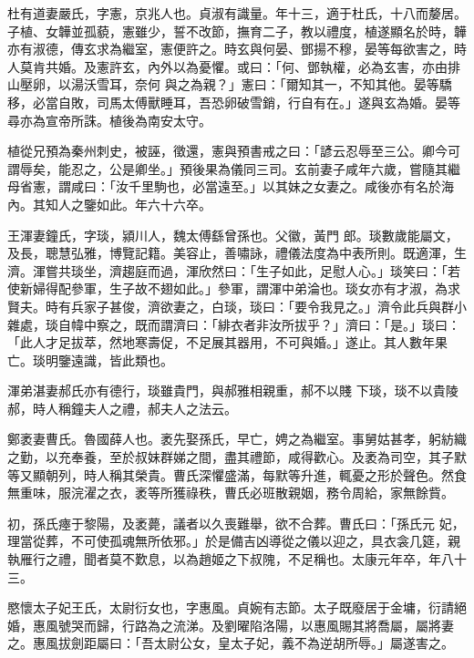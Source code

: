 \begin{pinyinscope}
 杜有道妻嚴氏，字憲，京兆人也。貞淑有識量。年十三，適于杜氏，十八而嫠居。子植、女韡並孤藐，憲雖少，誓不改節，撫育二子，教以禮度，植遂顯名於時，韡亦有淑德，傳玄求為繼室，憲便許之。時玄與何晏、鄧揚不穆，晏等每欲害之，時人莫肯共婚。及憲許玄，內外以為憂懼。或曰：「何、鄧執權，必為玄害，亦由排山壓卵，以湯沃雪耳，奈何
 與之為親？」憲曰：「爾知其一，不知其他。晏等驕移，必當自敗，司馬太傅獸睡耳，吾恐卵破雪銷，行自有在。」遂與玄為婚。晏等尋亦為宣帝所誅。植後為南安太守。



 植從兄預為秦州刺史，被誣，徵還，憲與預書戒之曰：「諺云忍辱至三公。卿今可謂辱矣，能忍之，公是卿坐。」預後果為儀同三司。玄前妻子咸年六歲，嘗隨其繼母省憲，謂咸曰：「汝千里駒也，必當遠至。」以其妹之女妻之。咸後亦有名於海內。其知人之鑒如此。年六十六卒。



 王渾妻鐘氏，字琰，潁川人，魏太傅繇曾孫也。父徽，黃門
 郎。琰數歲能屬文，及長，聰慧弘雅，博覽記籍。美容止，善嘯詠，禮儀法度為中表所則。既適渾，生濟。渾嘗共琰坐，濟趨庭而過，渾欣然曰：「生子如此，足慰人心。」琰笑曰：「若使新婦得配參軍，生子故不翅如此。」參軍，謂渾中弟淪也。琰女亦有才淑，為求賢夫。時有兵家子甚俊，濟欲妻之，白琰，琰曰：「要令我見之。」濟令此兵與群小雜處，琰自幃中察之，既而謂濟曰：「緋衣者非汝所拔乎？」濟曰：「是。」琰曰：「此人才足拔萃，然地寒壽促，不足展其器用，不可與婚。」遂止。其人數年果亡。琰明鑒遠識，皆此類也。



 渾弟湛妻郝氏亦有德行，琰雖貴門，與郝雅相親重，郝不以賤
 下琰，琰不以貴陵郝，時人稱鐘夫人之禮，郝夫人之法云。



 鄭袤妻曹氏。魯國薛人也。袤先娶孫氏，早亡，娉之為繼室。事舅姑甚孝，躬紡織之勤，以充奉養，至於叔妹群娣之間，盡其禮節，咸得歡心。及袤為司空，其子默等又顯朝列，時人稱其榮貴。曹氏深懼盛滿，每默等升進，輒憂之形於聲色。然食無重味，服浣濯之衣，袤等所獲祿秩，曹氏必班散親姻，務令周給，家無餘貲。



 初，孫氏瘞于黎陽，及袤薨，議者以久喪難舉，欲不合葬。曹氏曰：「孫氏元
 妃，理當從葬，不可使孤魂無所依邪。」於是備吉凶導從之儀以迎之，具衣衾几筵，親執雁行之禮，聞者莫不歎息，以為趙姬之下叔隗，不足稱也。太康元年卒，年八十三。



 愍懷太子妃王氏，太尉衍女也，字惠風。貞婉有志節。太子既廢居于金墉，衍請絕婚，惠風號哭而歸，行路為之流涕。及劉曜陷洛陽，以惠風賜其將喬屬，屬將妻之。惠風拔劍距屬曰：「吾太尉公女，皇太子妃，義不為逆胡所辱。」屬遂害之。




\end{pinyinscope}
